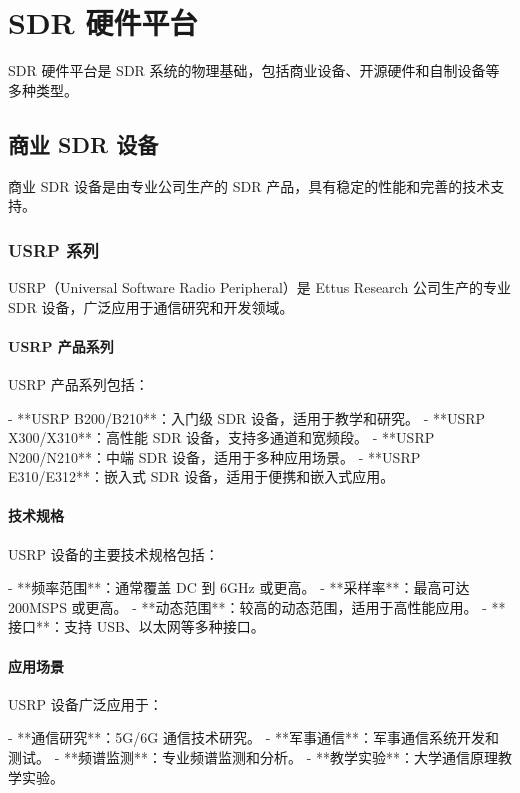 \documentclass[UTF8]{ctexbook}
\begin{document}
\chapter{SDR 硬件平台}

SDR 硬件平台是 SDR 系统的物理基础，包括商业设备、开源硬件和自制设备等多种类型。

\section{商业 SDR 设备}

商业 SDR 设备是由专业公司生产的 SDR 产品，具有稳定的性能和完善的技术支持。

\subsection{USRP 系列}

USRP（Universal Software Radio Peripheral）是 Ettus Research 公司生产的专业 SDR 设备，广泛应用于通信研究和开发领域。

\subsubsection{USRP 产品系列}

USRP 产品系列包括：

- **USRP B200/B210**：入门级 SDR 设备，适用于教学和研究。
- **USRP X300/X310**：高性能 SDR 设备，支持多通道和宽频段。
- **USRP N200/N210**：中端 SDR 设备，适用于多种应用场景。
- **USRP E310/E312**：嵌入式 SDR 设备，适用于便携和嵌入式应用。

\subsubsection{技术规格}

USRP 设备的主要技术规格包括：

- **频率范围**：通常覆盖 DC 到 6GHz 或更高。
- **采样率**：最高可达 200MSPS 或更高。
- **动态范围**：较高的动态范围，适用于高性能应用。
- **接口**：支持 USB、以太网等多种接口。

\subsubsection{应用场景}

USRP 设备广泛应用于：

- **通信研究**：5G/6G 通信技术研究。
- **军事通信**：军事通信系统开发和测试。
- **频谱监测**：专业频谱监测和分析。
- **教学实验**：大学通信原理教学实验。
\end{document}
